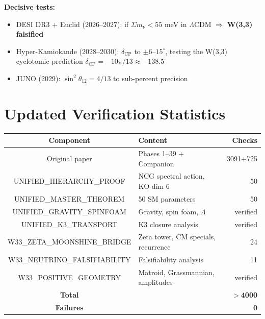 \noindent\textbf{Decisive tests:}
\begin{itemize}[nosep]
\item DESI DR3 + Euclid (2026--2027): if $\Sigma m_\nu < 55$ meV in $\Lambda$CDM
  $\Longrightarrow$ \textbf{W(3,3) falsified}
\item Hyper-Kamiokande (2028--2030): $\delta_{\mathrm{CP}}$ to $\pm 6$--$15^\circ$,
  testing the W(3,3) cyclotomic prediction $\delta_{\mathrm{CP}} = -10\pi/13 \approx -138.5^\circ$
\item JUNO (2029): $\sin^2\theta_{12} = 4/13$ to sub-percent precision
\end{itemize}


\section{Updated Verification Statistics}
\label{sec:updated-stats}

\begin{center}
\begin{tabular}{@{}clr@{}}
\toprule
\textbf{Component} & \textbf{Content} & \textbf{Checks} \\
\midrule
Original paper & Phases 1--39 + Companion & 3091+725 \\
UNIFIED\_HIERARCHY\_PROOF & NCG spectral action, KO-dim 6 & 50 \\
UNIFIED\_MASTER\_THEOREM & 50 SM parameters & 50 \\
UNIFIED\_GRAVITY\_SPINFOAM & Gravity, spin foam, $\Lambda$ & verified \\
UNIFIED\_K3\_TRANSPORT & K3 closure analysis & verified \\
W33\_ZETA\_MOONSHINE\_BRIDGE & Zeta tower, CM specials, recurrence & 24 \\
W33\_NEUTRINO\_FALSIFIABILITY & Falsifiability analysis & 11 \\
W33\_POSITIVE\_GEOMETRY & Matroid, Grassmannian, amplitudes & verified \\
\midrule
\textbf{Total} & & $>$\textbf{4000} \\
\textbf{Failures} & & \textbf{0} \\
\bottomrule
\end{tabular}
\end{center}
